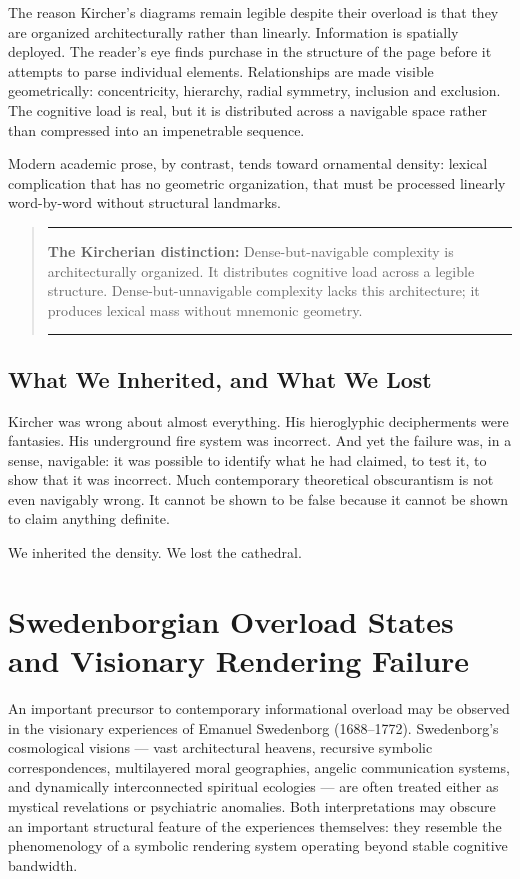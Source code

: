 \documentclass[12pt, a4paper]{article}
\newenvironment{claritybox}
  {\begin{quote}\small\color{fogblue}\rule{\linewidth}{0.6pt}\par\smallskip}
  {\par\smallskip\rule{\linewidth}{0.4pt}\end{quote}}
\begin{document}
The reason Kircher's diagrams remain legible despite their overload is that they are organized architecturally rather than linearly. Information is spatially deployed. The reader's eye finds purchase in the structure of the page before it attempts to parse individual elements. Relationships are made visible geometrically: concentricity, hierarchy, radial symmetry, inclusion and exclusion. The cognitive load is real, but it is distributed across a navigable space rather than compressed into an impenetrable sequence.

Modern academic prose, by contrast, tends toward ornamental density: lexical complication that has no geometric organization, that must be processed linearly word-by-word without structural landmarks.

\begin{claritybox}
\textbf{The Kircherian distinction:} Dense-but-navigable complexity is architecturally organized. It distributes cognitive load across a legible structure. Dense-but-unnavigable complexity lacks this architecture; it produces lexical mass without mnemonic geometry.
\end{claritybox}

\subsection{What We Inherited, and What We Lost}

Kircher was wrong about almost everything. His hieroglyphic decipherments were fantasies. His underground fire system was incorrect. And yet the failure was, in a sense, navigable: it was possible to identify what he had claimed, to test it, to show that it was incorrect. Much contemporary theoretical obscurantism is not even navigably wrong. It cannot be shown to be false because it cannot be shown to claim anything definite.

We inherited the density. We lost the cathedral.


\section{Swedenborgian Overload States and Visionary Rendering Failure}

An important precursor to contemporary informational overload may be observed in the visionary experiences of Emanuel Swedenborg (1688--1772). Swedenborg's cosmological visions --- vast architectural heavens, recursive symbolic correspondences, multilayered moral geographies, angelic communication systems, and dynamically interconnected spiritual ecologies --- are often treated either as mystical revelations or psychiatric anomalies. Both interpretations may obscure an important structural feature of the experiences themselves: they resemble the phenomenology of a symbolic rendering system operating beyond stable cognitive bandwidth.
\end{document}

